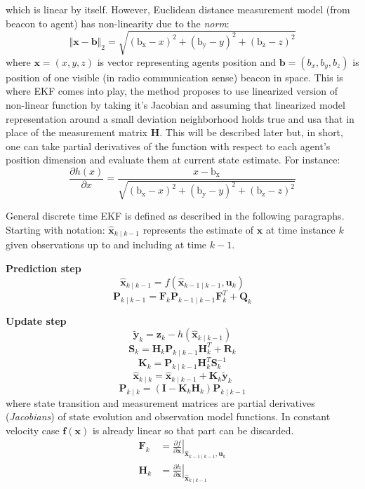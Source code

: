 which is linear by itself. However, Euclidean distance measurement model (from beacon to agent) has non-linearity due to the \emph{norm}:
$$
    \Vert\boldsymbol{x}-\boldsymbol{b}\Vert_2 = \sqrt{{\left(\mathrm{b_x}-x\right)}^2+{\left(\mathrm{b_y}-y\right)}^2+{\left(\mathrm{b_z}-z\right)}^2}
$$
where $\boldsymbol{x} = (x,y,z)$ is vector representing agents position and $\boldsymbol{b} = (b_x,b_y,b_z)$ is position of one visible (in radio communication sense) beacon in space. This is where EKF comes into play, the method proposes to use linearized version of non-linear function by taking it's Jacobian and assuming that linearized model representation around a small deviation neighborhood holds true and usa that in place of the measurement matrix $\boldsymbol{H}$. This will be described later but, in short, one can take partial derivatives of the function with respect to each agent's position dimension and evaluate them at current state estimate. For instance:
$$
    \frac{\partial h(x)}{\partial x} = \frac{x-\mathrm{b_x}}{\sqrt{{\left(\mathrm{b_x}-x\right)}^2+{\left(\mathrm{b_y}-y\right)}^2+{\left(\mathrm{b_z}-z\right)}^2}}
$$

General discrete time EKF is defined as described in the following paragraphs. Starting with notation: $\hat{\mathbf{x}}_{k \mid k-1}$ represents the estimate of $\mathbf{x}$ at time instance $k$ given observations up to and including at time $k-1$. \smallskip

\textbf{Prediction step} \smallskip
$$\hat{\boldsymbol{x}}_{k \mid k-1}=f\left(\hat{\boldsymbol{x}}_{k-1 \mid k-1}, \boldsymbol{u}_k\right)$$
$$\boldsymbol{P}_{k \mid k-1}=\boldsymbol{F}_k \boldsymbol{P}_{k-1 \mid k-1} \boldsymbol{F}_k^T+\boldsymbol{Q}_k$$

\textbf{Update step} \smallskip
$$\tilde{\boldsymbol{y}}_k=\boldsymbol{z}_k-h\left(\hat{\boldsymbol{x}}_{k \mid k-1}\right)$$
$$\boldsymbol{S}_k=\boldsymbol{H}_k \boldsymbol{P}_{k \mid k-1} \boldsymbol{H}_k^T+\boldsymbol{R}_k$$
$$\boldsymbol{K}_k=\boldsymbol{P}_{k \mid k-1} \boldsymbol{H}_k^T \boldsymbol{S}_k^{-1}$$
$$\hat{\boldsymbol{x}}_{k \mid k}=\hat{\boldsymbol{x}}_{k \mid k-1}+\boldsymbol{K}_k \tilde{\boldsymbol{y}}_k$$
$$\boldsymbol{P}_{k \mid k}=\left(\boldsymbol{I}-\boldsymbol{K}_k \boldsymbol{H}_k\right) \boldsymbol{P}_{k \mid k-1}$$
where state transition and measurement matrices are partial derivatives (\emph{Jacobians}) of state evolution and observation model functions. In constant velocity case $\boldsymbol{f}(\boldsymbol{x})$ is already linear so that part can be discarded.
$$
    \begin{aligned}
        \boldsymbol{F}_k & =\left.\frac{\partial f}{\partial \boldsymbol{x}}\right|_{\hat{\boldsymbol{x}}_{k-1 \mid k-1}, \boldsymbol{u}_k} \\
        \boldsymbol{H}_k & =\left.\frac{\partial h}{\partial \boldsymbol{x}}\right|_{\hat{\boldsymbol{x}}_{k \mid k-1}}
    \end{aligned}
$$

